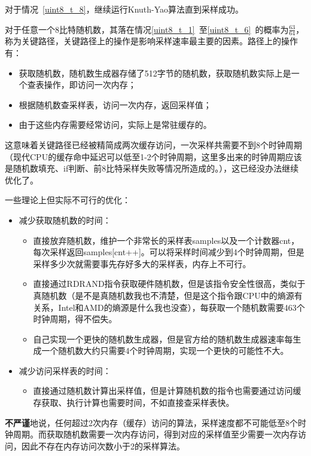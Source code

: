 \documentclass{article}
\begin{document}
    对于情况~\ref{uint8_t_8}，继续运行Knuth-Yao算法直到采样成功。
    
    对于任意一个8比特随机数，其落在情况\ref{uint8_t_1}~至\ref{uint8_t_6}~的概率为$\frac{63}{64}$，称为关键路径，关键路径上的操作是影响采样速率最主要的因素。路径上的操作有：
    \begin{itemize}
        \item 获取随机数，随机数生成器存储了512字节的随机数，获取随机数实际上是一个查表操作，即访问一次内存；
        \item 根据随机数查采样表，访问一次内存，返回采样值；
        \item 由于这些内存需要经常访问，实际上是常驻缓存的。
    \end{itemize}
    这意味着关键路径已经被精简成两次缓存访问，一次采样共需要不到8个时钟周期（现代CPU的缓存命中延迟可以低至1-2个时钟周期，这里多出来的时钟周期应该是随机数填充、if判断、前8比特采样失败等情况所造成的。），这已经没办法继续优化了。
    
    一些理论上但实际不可行的优化：
    \begin{itemize}
        \item 减少获取随机数的时间：
        \begin{itemize}
            \item 直接放弃随机数，维护一个非常长的采样表samples以及一个计数器cnt，每次采样返回samples[cnt++]。可以将采样时间减少到4个时钟周期，但是采样多少次就需要事先存好多大的采样表，内存上不可行。
            \item 直接通过RDRAND指令获取硬件随机数，但是该指令安全性很高，类似于真随机数（是不是真随机数我也不清楚，但是这个指令跟CPU中的熵源有关系，Intel和AMD的熵源是什么我也没查），每获取一个随机数需要463个时钟周期，得不偿失。
            \item 自己实现一个更快的随机数生成器，但是官方给的随机数生成器速率每生成一个随机数大约只需要4个时钟周期，实现一个更快的可能性不大。
        \end{itemize}
        \item 减少访问采样表的时间：
        \begin{itemize}
            \item 直接通过随机数计算出采样值，但是计算随机数的指令也需要通过访问缓存获取、执行计算也需要时间，不如直接查采样表快。
        \end{itemize}
    \end{itemize}
    \textbf{不严谨}地说，任何超过2次内存（缓存）访问的算法，采样速度都不可能低至8个时钟周期。而获取随机数需要一次内存访问，得到对应的采样值至少需要一次内存访问，因此不存在内存访问次数小于2的采样算法。
    
\end{document}
